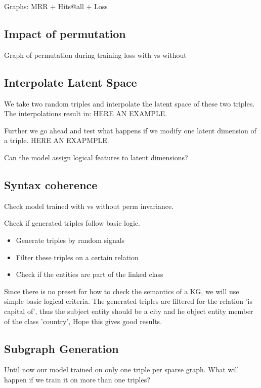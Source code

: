 Graphs:
MRR + Hits@all + Loss

\subsection{Impact of permutation}

Graph of permutation during training
loss with vs without 

\subsection{Interpolate Latent Space}
We take two random triples and interpolate the latent space of these two triples. The interpolations result in: HERE AN EXAMPLE.

Further we go ahead and test what happens if we modify one latent dimension of a triple. HERE AN EXAPMPLE.

Can the model assign logical features to latent dimensions?


\subsection{Syntax coherence}

Check model trained with vs without perm invariance.

Check if generated triples follow basic logic.
\begin{itemize}
    \item Generate triples by random signals
    \item Filter these triples on a certain relation
    \item Check if the entities are part of the linked class
\end{itemize}

Since there is no preset for how to check the semantics of a KG, we will use simple basic logical criteria.
The generated triples are filtered for the relation 'is capital of', thus the subject entity should be a city and he object entity member of the class 'country',
Hope this gives good results.

\subsection{Subgraph Generation}
Until now our model trained on only one triple per sparse graph. What will happen if we train it on more than one triples?
